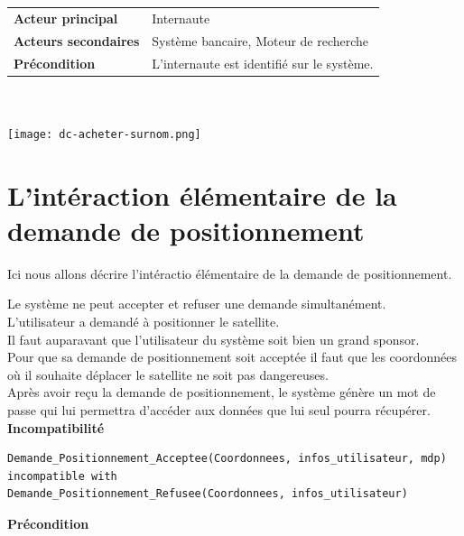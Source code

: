 \documentclass[11pt,a4paper]{article}
\begin{document}
~\\
~\\


\begin{tabular}{ll}
    \textbf{Acteur principal} & Internaute \\
    \textbf{Acteurs secondaires} & Système bancaire, Moteur de recherche \\
    \textbf{Précondition} & L’internaute est identifié sur le système.
\end{tabular}
~\\
~\\


\texttt{[image: dc-acheter-surnom.png]}

\newpage


\section{L'int\'eraction \'el\'ementaire de la demande de positionnement}

Ici nous allons décrire l'intéractio élémentaire de la demande de positionnement. \newline

Le système ne peut accepter et refuser une demande simultanément.\\
L’utilisateur a demandé à positionner le satellite. \\
Il faut auparavant que l’utilisateur du système soit bien un grand sponsor. \\
Pour que sa demande de positionnement soit acceptée il faut que les coordonnées où il souhaite déplacer le satellite ne soit pas dangereuses. \\
Après avoir reçu la demande de positionnement, le système génère un mot de passe qui lui permettra d’accéder aux données que lui seul pourra récupérer. \\


\textbf{Incompatibilité} \\

\begin{lstlisting}
Demande_Positionnement_Acceptee(Coordonnees, infos_utilisateur, mdp) 
incompatible with 
Demande_Positionnement_Refusee(Coordonnees, infos_utilisateur)
\end{lstlisting}

\vspace{2cm}

\textbf{Précondition} \\
\end{document}
